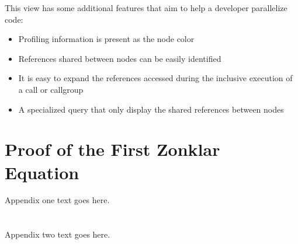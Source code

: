 \documentclass[conference]{IEEEtran}
\begin{document}
This view has some additional features that aim to help a developer parallelize code:

\begin{itemize}
	\item Profiling information is present as the node color
	\item References shared between nodes can be easily identified
	\item It is easy to expand the references accessed during the inclusive execution of a call or callgroup
	\item A specialized query that only display the shared references between nodes
\end{itemize}

\appendices
\section{Proof of the First Zonklar Equation}
Appendix one text goes here.

\section{}
Appendix two text goes here.

\ifCLASSOPTIONcaptionsoff
  \newpage
\fi
\end{document}
